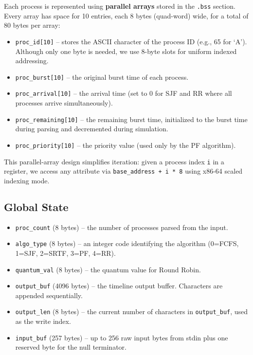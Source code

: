 \documentclass[a4paper,12pt]{article}
\begin{document}
Each process is represented using \textbf{parallel arrays} stored in the \texttt{.bss} section. Every array has space for 10 entries, each 8 bytes (quad-word) wide, for a total of 80 bytes per array:

\begin{itemize}
    \item \texttt{proc\_id[10]} -- stores the ASCII character of the process ID (e.g., 65 for `A'). Although only one byte is needed, we use 8-byte slots for uniform indexed addressing.
    \item \texttt{proc\_burst[10]} -- the original burst time of each process.
    \item \texttt{proc\_arrival[10]} -- the arrival time (set to 0 for SJF and RR where all processes arrive simultaneously).
    \item \texttt{proc\_remaining[10]} -- the remaining burst time, initialized to the burst time during parsing and decremented during simulation.
    \item \texttt{proc\_priority[10]} -- the priority value (used only by the PF algorithm).
\end{itemize}

This parallel-array design simplifies iteration: given a process index \texttt{i} in a register, we access any attribute via \texttt{base\_address + i * 8} using x86-64 scaled indexing mode.

\subsection{Global State}

\begin{itemize}
    \item \texttt{proc\_count} (8 bytes) -- the number of processes parsed from the input.
    \item \texttt{algo\_type} (8 bytes) -- an integer code identifying the algorithm (0=FCFS, 1=SJF, 2=SRTF, 3=PF, 4=RR).
    \item \texttt{quantum\_val} (8 bytes) -- the quantum value for Round Robin.
    \item \texttt{output\_buf} (4096 bytes) -- the timeline output buffer. Characters are appended sequentially.
    \item \texttt{output\_len} (8 bytes) -- the current number of characters in \texttt{output\_buf}, used as the write index.
    \item \texttt{input\_buf} (257 bytes) -- up to 256 raw input bytes from stdin plus one reserved byte for the null terminator.
\end{itemize}
\end{document}
